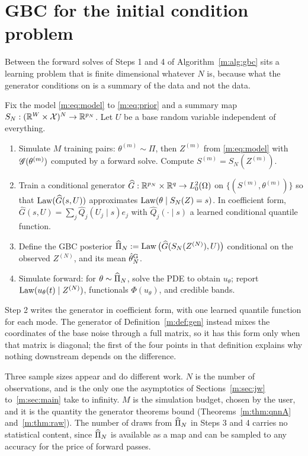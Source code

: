 \section{GBC for the initial condition problem}\label{m:sec:gbc}

Between the forward solves of Steps 1 and 4 of Algorithm~\ref{m:alg:gbc} sits a learning problem that is finite dimensional whatever $N$ is, because what the generator conditions on is a summary of the data and not the data.

Fix the model \eqref{m:eq:model} to \eqref{m:eq:prior} and a summary map $S_N:(\mathbb{R}^W\times\mathcal X)^N\to\mathbb{R}^{p_N}$. Let $U$ be a base random variable independent of everything.

\begin{algorithm}\label{m:alg:gbc}\leavevmode
\begin{enumerate}[nosep]
\item Simulate $M$ training pairs: $\theta^{(m)}\sim\Pi$, then $Z^{(m)}$ from \eqref{m:eq:model} with $\mathscr{G}(\theta^{(m)})$ computed by a forward solve. Compute $S^{(m)}=S_N(Z^{(m)})$.
\item Train a conditional generator $\widehat G:\mathbb{R}^{p_N}\times\mathbb{R}^q\to L^2_0(\Omega)$ on $\{(S^{(m)},\theta^{(m)})\}$ so that $\operatorname{Law}(\widehat G(s,U))$ approximates $\operatorname{Law}(\theta\mid S_N(Z)=s)$. In coefficient form, $\widehat G(s,U)=\sum_j\widehat Q_j(U_j\mid s)e_j$ with $\widehat Q_j(\cdot\mid s)$ a learned conditional quantile function.
\item Define the GBC posterior $\widehat\Pi_N:=\operatorname{Law}\big(\widehat G(S_N(Z^{(N)}),U)\big)$ conditional on the observed $Z^{(N)}$, and its mean $\hat\theta_N^{\rm G}$.
\item Simulate forward: for $\theta\sim\widehat\Pi_N$, solve the PDE to obtain $u_\theta$; report $\operatorname{Law}(u_\theta(t)\mid Z^{(N)})$, functionals $\Phi(u_\theta)$, and credible bands.
\end{enumerate}
\end{algorithm}

Step 2 writes the generator in coefficient form, with one learned quantile function for each mode. The generator of Definition~\ref{m:def:gen} instead mixes the coordinates of the base noise through a full matrix, so it has this form only when that matrix is diagonal; the first of the four points in that definition explains why nothing downstream depends on the difference.

Three sample sizes appear and do different work. $N$ is the number of observations, and is the only one the asymptotics of Sections~\ref{m:sec:jw} to~\ref{m:sec:main} take to infinity. $M$ is the simulation budget, chosen by the user, and it is the quantity the generator theorems bound (Theorems~\ref{m:thm:qnnA} and~\ref{m:thm:raw}). The number of draws from $\widehat\Pi_N$ in Steps 3 and 4 carries no statistical content, since $\widehat\Pi_N$ is available as a map and can be sampled to any accuracy for the price of forward passes.

